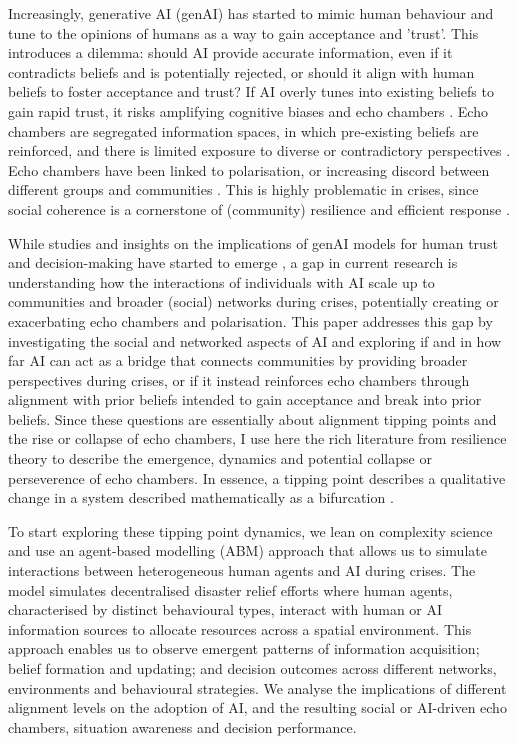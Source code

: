 \documentclass[pdflatex,sn-apa]{sn-jnl}%
\begin{document}
Increasingly, generative AI (genAI) has started to mimic human behaviour and tune to the opinions of humans \citep{sharma2024generative} as a way to gain acceptance and 'trust'. This introduces a dilemma: should AI provide accurate information, even if it contradicts beliefs and is potentially rejected, or should it align with human beliefs to foster acceptance and trust? If AI overly tunes into existing beliefs to gain rapid trust, it risks amplifying cognitive biases and echo chambers \citep{ekstrom2022self}. Echo chambers are segregated information spaces, in which pre-existing beliefs are reinforced, and there is limited exposure to diverse or contradictory perspectives \citep{jeon2024hearhere}. Echo chambers have been linked to polarisation, or increasing discord between different groups and communities \citep{interian2023network}. This is highly problematic in crises, since social coherence is a cornerstone of (community) resilience and efficient response \citep{champlin2023measuring}. 

While studies and insights on the implications of genAI models for human trust and decision-making have started to emerge \citep{zhang2024see, sharma2024generative}, a gap in current research is understanding how the interactions of individuals with AI scale up to communities and broader (social) networks during crises, potentially creating or exacerbating echo chambers and polarisation. This paper addresses this gap by investigating the social and networked aspects of AI and exploring if and in how far AI can act as a bridge that connects communities by providing broader perspectives during crises, or if it instead reinforces echo chambers through alignment with prior beliefs intended to gain acceptance and break into prior beliefs. Since these questions are essentially about alignment tipping points and the rise or collapse of echo chambers, I use here the rich literature from resilience theory \citep{folke2016resilience} to describe the emergence, dynamics and potential collapse or perseverence of echo chambers. In essence, a tipping point describes a qualitative change in a system described mathematically as a bifurcation \citep{milkoreit2018defining}.

To start exploring these tipping point dynamics, we lean on complexity science and use an agent-based modelling (ABM) approach that allows us to simulate interactions between heterogeneous human agents and AI during crises. The model simulates decentralised disaster relief efforts where human agents, characterised by distinct behavioural types, interact with human or AI information sources to allocate resources across a spatial environment. This approach enables us to observe emergent patterns of information acquisition; belief formation and updating; and decision outcomes across different networks, environments and behavioural strategies. We analyse the implications of different alignment levels on the adoption of AI, and the resulting social or AI-driven echo chambers, situation awareness and decision performance. 
\end{document}
